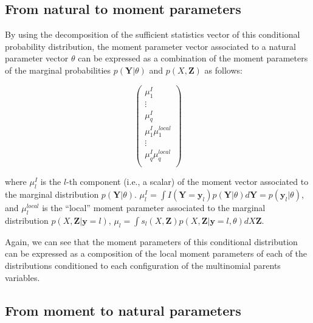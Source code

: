 \documentclass[11pt, oneside]{article}   	%
\newcommand{\bm}{\mathbf}
\numberwithin{figure}{section}
\numberwithin{equation}{section}
\numberwithin{table}{section}
\theoremstyle{definition}
\begin{document}
\subsection{From natural to moment parameters} \label{Section:CD_With_MParents:NaturalToMoment}

By using the decomposition of the sufficient statistics vector of this conditional probability distribution, the moment parameter vector associated to a natural parameter vector $\theta$ can be expressed as a combination of the moment parameters of the marginal probabilities $p(\bm Y|\theta)$ and $p(X, \bm Z)$ as follows:

$$ 
\begin{pmatrix}
\mu^{I}_1  \\
\vdots \\
\mu^{I}_q \\
\mu^{I}_1 \mu^{local}_1\\
\vdots \\
\mu^{I}_q \mu^{local}_q\\
\end{pmatrix}
$$

\noindent where  $\mu^{I}_l$ is the $l$-th component (i.e., a scalar) of the moment vector associated to the marginal distribution $p(\bm Y|\theta)$.  $\mu^{I}_l  = \int I(\bm Y = \bm y_l) p(\bm Y|\theta) d\bm Y= p(\bm y_l|\theta)$, and $\mu^{local}_l$  is the ``local'' moment parameter associated to the marginal distribution $p(X,\bm Z| \bm y = l)$, $\mu_l = \int s_l(X, \bm Z)p(X,\bm Z|\bm y = l, \theta) dX\bm Z$. 

Again, we can see that the moment parameters of this conditional distribution can be expressed as a composition of the local moment parameters of each of the distributions conditioned to each configuration of the multinomial parents variables. 

\subsection{From moment to natural parameters} \label{Section:CD_With_MParents:MomentToNatural}
\end{document}

